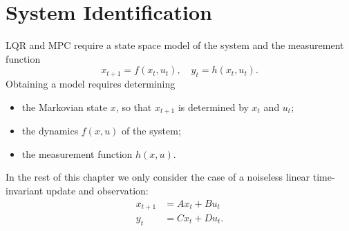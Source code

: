 \chapter{System Identification}
\label{sec:system-identification}

LQR and MPC require a state space model of the system and the measurement function
\begin{equation*}
  x_{t+1} = f(x_t,u_t),\quad y_t = h(x_t,u_t).
\end{equation*}
Obtaining a model requires determining
\begin{itemize}
\item the Markovian state $x$, so that $x_{t+1}$ is determined by $x_t$ and $u_t$;
\item the dynamics $f(x,u)$ of the system;
\item the measurement function $h(x,u)$.
\end{itemize}
In the rest of this chapter we only consider the case of a noiseless linear time-invariant update and observation:
\begin{equation}
  \label{eq:sysid-dynamics}
  \begin{aligned}
    x_{t+1} &= Ax_t + Bu_t \\
    y_t &= Cx_t + Du_t.
  \end{aligned}
\end{equation}

